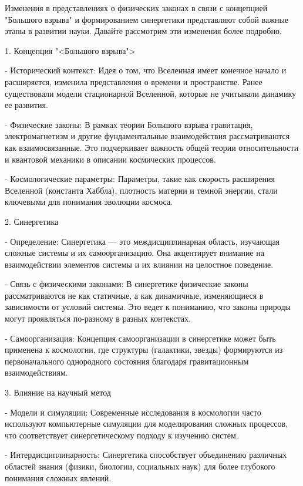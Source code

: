 \documentclass[exam_answers.tex]{subfiles}
\begin{document}
\renewcommand{\baselinestretch}{\blch}

Изменения в представлениях о физических законах в связи с концепцией "Большого взрыва" и формированием синергетики представляют собой важные этапы в развитии науки. Давайте рассмотрим эти изменения более подробно.

1. Концепция "<Большого взрыва">

- Исторический контекст: Идея о том, что Вселенная имеет конечное начало и расширяется, изменила представления о времени и пространстве. Ранее существовали модели стационарной Вселенной, которые не учитывали динамику ее развития.

- Физические законы: В рамках теории Большого взрыва гравитация, электромагнетизм и другие фундаментальные взаимодействия рассматриваются как взаимосвязанные. Это подчеркивает важность общей теории относительности и квантовой механики в описании космических процессов.

- Космологические параметры: Параметры, такие как скорость расширения Вселенной (константа Хаббла), плотность материи и темной энергии, стали ключевыми для понимания эволюции космоса.

2. Синергетика

- Определение: Синергетика — это междисциплинарная область, изучающая сложные системы и их самоорганизацию. Она акцентирует внимание на взаимодействии элементов системы и их влиянии на целостное поведение.

- Связь с физическими законами: В синергетике физические законы рассматриваются не как статичные, а как динамичные, изменяющиеся в зависимости от условий системы. Это ведет к пониманию, что законы природы могут проявляться по-разному в разных контекстах.

- Самоорганизация: Концепция самоорганизации в синергетике может быть применена к космологии, где структуры (галактики, звезды) формируются из первоначального однородного состояния благодаря гравитационным взаимодействиям.

3. Влияние на научный метод

- Модели и симуляции: Современные исследования в космологии часто используют компьютерные симуляции для моделирования сложных процессов, что соответствует синергетическому подходу к изучению систем.

- Интердисциплинарность: Синергетика способствует объединению различных областей знания (физики, биологии, социальных наук) для более глубокого понимания сложных явлений.
\end{document}
